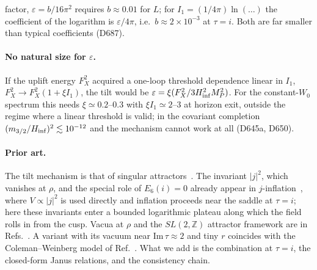 \documentclass[aps,prd,twocolumn,superscriptaddress,nofootinbib,floatfix]{revtex4-2}
\begin{document}
factor, $\varepsilon=b/16\pi^2$ requires $b\approx0.01$ for $L$; for $I_1=(1/4\pi)\ln(\dots)$ the coefficient of the logarithm is $\varepsilon/4\pi$, i.e.\ $b\approx2\times10^{-3}$ at $\tau=i$. Both are far smaller than typical coefficients (D687).

\paragraph{No natural size for $\varepsilon$.} If the uplift energy $F_X^2$ acquired a one-loop threshold dependence linear in $I_1$, $F_X^2\to F_X^2(1+\xi I_1)$, the tilt would be $\varepsilon=\xi(F_X^2/3H_{\rm inf}^2M_P^2)$. For the constant-$W_0$ spectrum this needs $\xi\simeq0.2$--$0.3$ with $\xi I_1\simeq2$--$3$ at horizon exit, outside the regime where a linear threshold is valid; in the covariant completion $(m_{3/2}/H_{\rm inf})^2\lesssim10^{-12}$ and the mechanism cannot work at all (D645a, D650).

\paragraph{Prior art.} The tilt mechanism is that of singular attractors~\cite{arXiv_2512_02969}. The invariant $|j|^2$, which vanishes at $\rho$, and the special role of $E_6(i)=0$ already appear in $j$-inflation~\cite{arXiv_1612_09559}, where $V\propto|j|^2$ is used directly and inflation proceeds near the saddle at $\tau=i$; here these invariants enter a bounded logarithmic plateau along which the field rolls in from the cusp. Vacua at $\rho$ and the $SL(2,\mathbb{Z})$ attractor framework are in Refs.~\cite{arXiv_2408_05203,arXiv_2412_19324}. A variant with its vacuum near $\mathrm{Im}\,\tau \approx 2$ and tiny $r$ coincides with the Coleman--Weinberg model of Ref.~\cite{arXiv_2607_00528}. What we add is the combination at $\tau = i$, the closed-form Janus relations, and the consistency chain.
\end{document}
